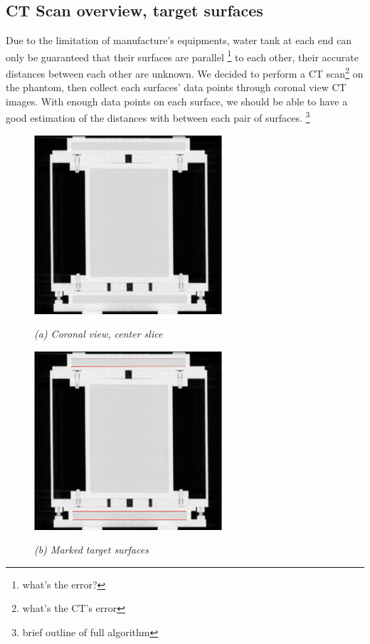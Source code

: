 
\subsection{CT Scan overview, target surfaces}
Due to the limitation of manufacture's equipments, water tank at each end can only be guaranteed that their
surfaces are parallel \footnote{what's the error?} to each other, their accurate distances between each other
are unknown. We decided to perform a CT scan\footnote{what's the CT's error} on the phantom, then collect each
surfaces' data points through coronal view CT images. With enough data points on each surface, we should be
able to have a good estimation of the distances with between each pair of surfaces. \footnote{brief outline of full algorithm}

\begin{figure}[htb]
  \begin{minipage}[b]{2.75in}
    \centering
    \centerline{\mbox{\includegraphics[width=2.75in]{data_extraction/images/targets/ct_coronal_mid_slice.eps}}}
    \centerline{\emph{(a) Coronal view, center slice}}
  \end{minipage}\medskip
  \begin{minipage}[b]{2.75in}
    \centering
    \centerline{\mbox{\includegraphics[width=2.75in]{data_extraction/images/targets/ct_coronal_mid_slice_marked_surface.eps}}}
    \centerline{\emph{(b) Marked target surfaces}}
  \end{minipage}
\end{figure}

